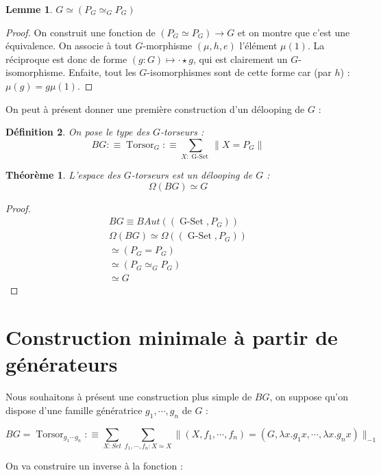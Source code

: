 \documentclass{article}
\DeclareMathOperator{\gset}{G-Set}
\DeclareMathOperator{\torsor}{Torsor}
\newtheorem{definition}{Définition}[section]
\newtheorem{theorem}{Théorème}[section]
\newtheorem{lemme}[definition]{Lemme}
\begin{document}
\begin{lemme}
  $G \simeq (P_{G} \simeq_{G} P_{G})$
\end{lemme}

\begin{proof}
  On construit une fonction de $(P_{G} \simeq P_{G}) \to G$ et on montre que c'est une équivalence. On associe à tout $G$-morphisme $(\mu, h, e)$ l'élément $\mu(1)$. La réciproque est donc de forme $(g : G) \mapsto \cdot \star g$, qui est clairement un $G$-isomorphisme. Enfaite, tout les $G$-isomorphismes sont de cette forme car (par $h$) : $\mu(g) = g \mu(1)$.
\end{proof}

On peut à présent donner une première construction d'un délooping de $G$ :

\begin{definition}
  On pose le type des $G$-torseurs :
    \[BG :\equiv \torsor_{G} :\equiv \sum_{X : \gset}\|X = P_{G}\|\]
\end{definition}

\begin{theorem}
  L'espace des $G$-torseurs est un délooping de $G$ :
  \[\Omega(BG) \simeq G\]
\end{theorem}

\begin{proof}
  \begin{gather*}
            BG \equiv BAut((\gset, P_{G})) \\
    \Omega(BG) \simeq \Omega((\gset, P_{G})) \\
               \simeq (P_{G} = P_{G}) \\
               \simeq (P_{G} \simeq_{G} P_{G}) \\
               \simeq G
  \end{gather*}
\end{proof}

\section{Construction minimale à partir de générateurs}

Nous souhaitons à présent une construction plus simple de $BG$, on suppose qu'on dispose d'une famille génératrice $g_1, \cdots, g_{n}$ de $G$ :

\[BG =  \torsor_{g_1 \cdots g_{n}} :\equiv \sum_{X : Set} \sum_{f_1,\cdots,f_{n} : X \simeq X}\|(X,f_1,\cdots,f_{n}) = (G,\lambda x.g_1x,\cdots,\lambda x.g_{n}x)\|_{-1}\]

On va construire un inverse à la fonction :
\end{document}
